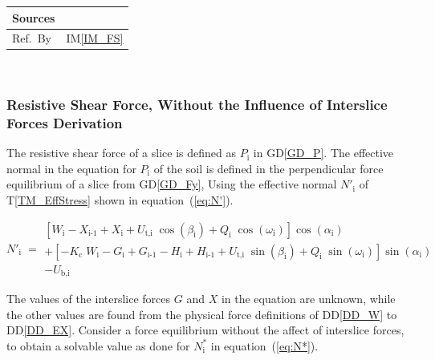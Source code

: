 \documentclass[12pt]{article}
\newcommand{\colAwidth}{0.13\textwidth}
\newcommand{\colBwidth}{0.82\textwidth}
\newcommand{\tref}[1]{T\ref{#1}}
\newcommand{\iref}[1]{IM\ref{#1}}
\newcommand{\ddref}[1]{DD\ref{#1}}
\newcommand{\dref}[1]{GD\ref{#1}}
\begin{document}
\begin{minipage}{\textwidth}
\begin{tabular}{| p{\colAwidth} | p{\colBwidth} |}
\hline Sources& \cite{ZhuEtAl2005}\\

\hline Ref.\ By & \iref{IM_FS}\\

\hline
\end{tabular}
\end{minipage}\\


\subsubsection*{Resistive Shear Force, Without the
  Influence of Interslice Forces Derivation}

\noindent
The resistive shear force of a slice is defined as $P_\text{i}$ in
\dref{GD_P}.  The effective normal in the equation for $P_\text{i}$ of
the soil is defined in the perpendicular force equilibrium of a slice
from \dref{GD_Fy}, Using the effective normal $N'_\text{i}$ of
\tref{TM_EffStress} shown in equation~(\ref{eq:N'}).

\begin{equation} \label{eq:N'}
 N'_{\text{i}} \; = \begin{array}{l}
   \left[ W_{\text{i}} - X_{\text{i-1}} + X_{\text{i}} +
     {U_{\text{t,i}}}\;{\cos\left(\beta_{\text{i}}\right)} +
     Q_{\text{i}}\;{\cos\left(\omega_{\text{i}}\right)}
     \right]\cos\left(\alpha_{\text{i}}\right) \\ + \left[
     {-K_{\text{c}}}\;{W_{\text{i}}} - G_{\text{i}} + G_{\text{i-1}} -
     H_{\text{i}} + H_{\text{i-1}} +
     {U_{\text{t,i}}}\;{\sin\left(\beta_{\text{i}}\right)} +
     Q_{\text{i}}\;{\sin\left(\omega_{\text{i}}\right)}
     \right]\sin\left(\alpha_{\text{i}}\right) \\ -
   U_{\text{b,i}} \end{array}
 \end{equation}

\noindent
The values of the interslice forces $G$ and $X$ in the equation are
unknown, while the other values are found from the physical force
definitions of \ddref{DD_W} to \ddref{DD_EX}.  Consider a force
equilibrium without the affect of interslice
forces, to obtain a solvable value as done for $N^*_\text{i}$ in
equation~(\ref{eq:N*}).
\end{document}
